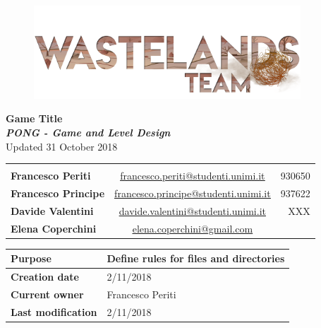 \documentclass[12pt]{article}
\begin{document}
\begin{center}
  \begin{figure}
    \centering
  \vspace*{5\baselineskip}
  \includegraphics[width=10cm]{Documents/Images/logoTeam}
  \end{figure}

  {\large \textbf{Game Title}} \\
  \textbf{\textit{PONG - Game and Level Design}} \\
  {\small Updated 31 October 2018} \\

  \begin{tabular}{lcr}\\\\
    \textbf{Francesco Periti}	& \underline{\href{mailto:francesco.periti@studenti.unimi.it}{francesco.periti@studenti.unimi.it}}	& 930650 \\
    \textbf{Francesco Principe}	& \underline{\href{mailto:francesco.principe@studenti.unimi.it}{francesco.principe@studenti.unimi.it}}	& 937622 \\
    \textbf{Davide Valentini}	& \underline{\href{mailto:davide.valentini@studenti.unimi.it}{davide.valentini@studenti.unimi.it}}	& XXX \\
    \textbf{Elena Coperchini}	& \underline{\href{mailto:elena.coperchini@gmail.com}{elena.coperchini@gmail.com}}			& \\
  \end{tabular}


\begin{table}[] 
  \begin{tabular}{|l|l||}
    \hline
    \cellcolor{gray}\textbf{Purpose} &  Define rules for files and directories \\\hline
    \cellcolor{gray}\textbf{Creation date} & 2/11/2018 \\\hline
    \cellcolor{gray}\textbf{Current owner} & Francesco Periti \\\hline
    \cellcolor{gray}\textbf{Last modification} & 2/11/2018 \\\hline
  \end{tabular}
\end{table}


\end{center}
\end{document}
